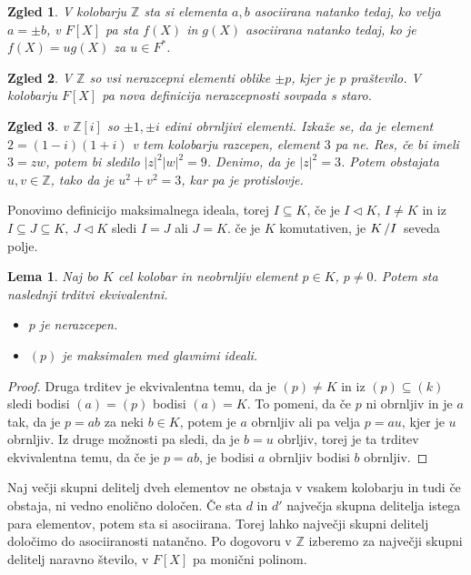 \documentclass[10pt, a4paper]{article}
\newtheorem{zgled}{Zgled}[section]
\newtheorem{lema}[izr]{Lema}
\newenvironment{noticeC}{%
  \tcolorbox[%
  notitle,
  empty,
  enhanced,  %
  breakable,
  coltext=black, 
  fontupper=\rmfamily,
  noparskip,
  sharp corners,
  boxrule=-1pt,  %
  frame hidden,
  left=7pt,  %
  right=7pt,
  top=5pt,
  bottom=5pt,
  before skip=2.5ex plus 2pt,
  after skip=2.5ex plus 2pt,
  overlay unbroken and last={%
  },
  ]}
{\endtcolorbox}
\newenvironment{dokaz}%
  {\begin{noticeC}\begin{proof}}%
  {\end{proof}\end{noticeC}}
\newcommand{\Z}{\mathbb {Z}}
\newcommand{\quot}[2]{{\raisebox{0em}{$#1$}\left/\raisebox{0em}{$#2$}\right.}}
\begin{document}
\begin{zgled}
  V kolobarju $\Z$ sta si elementa $a, b$ asociirana natanko tedaj,
  ko velja $a = \pm b$, v $F[X]$ pa sta $f(X)$ in $g(X)$ asociirana natanko tedaj,
  ko je $f(X) = u g(X)$ za $u \in F^*$.
\end{zgled}

\begin{zgled}
  V $\Z$ so vsi nerazcepni elementi oblike $\pm p$, kjer je $p$ praštevilo.
  V kolobarju $F[X]$ pa nova definicija nerazcepnosti sovpada s staro.
\end{zgled}

\begin{zgled}
  v $\Z[i]$ so $\pm 1, \pm i$ edini obrnljivi elementi.
  Izkaže se, da je element $2 = (1 - i) (1 + i)$ v tem kolobarju razcepen,
  element $3$ pa ne. Res, če bi imeli $3 = zw$, potem bi sledilo $|z|^2 |w|^2 = 9$.
  Denimo, da je $|z|^2 = 3$. Potem obstajata $u, v \in \Z$, tako da je $u^2 + v^2 = 3$,
  kar pa je protislovje.
\end{zgled}

Ponovimo definicijo maksimalnega ideala, torej $I \subseteq K$, če je 
$I \lhd K$, $I \neq K$ in iz $I \subseteq J \subseteq K,\ J \lhd K$ sledi $I = J$ ali $J = K$.
če je $K$ komutativen, je $\quot{K}{I}$ seveda polje.

\begin{lema}
  Naj bo $K$ cel kolobar in neobrnljiv element $p \in K$, $p \neq 0$. Potem sta naslednji trditvi ekvivalentni.
  \begin{itemize}
    \item $p$ je nerazcepen.
    \item $(p)$ je maksimalen med glavnimi ideali.
  \end{itemize}
\end{lema}

\begin{dokaz}
  Druga trditev je ekvivalentna temu, da je $(p) \neq K$ in iz $(p) \subseteq (k)$
  sledi bodisi $(a) = (p)$ bodisi $(a) = K.$
  To pomeni, da če $p$ ni obrnljiv in je $a$ tak, da je $p = ab$ za neki $b \in K$,
  potem je $a$ obrnljiv ali pa velja $p = au$, kjer je $u$ obrnljiv. Iz druge možnosti pa sledi, da je $b = u$ obrljiv,
  torej je ta trditev ekvivalentna temu, da če je $p = ab$, je bodisi $a$ obrnljiv bodisi $b$ obrnljiv.
\end{dokaz}

Naj večji skupni delitelj dveh elementov ne obstaja v vsakem kolobarju in tudi če obstaja,
ni vedno enolično določen. Če sta $d$ in $d'$ največja skupna delitelja istega para elementov,
potem sta si asociirana. Torej lahko največji skupni delitelj določimo do asociiranosti natančno.
Po dogovoru v $\Z$ izberemo za največji skupni delitelj naravno število, v $F[X]$ pa monični polinom.
\end{document}
